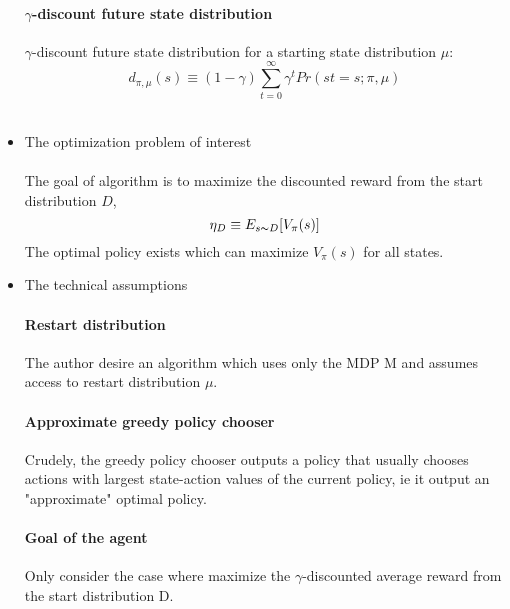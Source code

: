 \begin{itemize}
    
    \paragraph{$\gamma$-discount future state distribution \\} $\gamma$-discount future state distribution for
    a starting state distribution $\mu$:
    \[d_{\pi,\mu}(s) \equiv (1 - \gamma) \sum_{t=0}^{\infty} \gamma^{t} Pr(st=s;\pi, \mu) \] \\
    
    
    
    \item The optimization problem of interest
    \paragraph{}
    The goal of algorithm is to maximize the discounted reward from the start distribution $D$,
    \[\eta_{D} \equiv E_{s{\thicksim}D}[V_{\pi}(s)]\]
    The optimal policy exists which can maximize $V_{\pi}(s)$ for all states. \\
    
    \newpage
    \item The technical assumptions
    \paragraph{Restart distribution \\}
    The author desire an algorithm which uses only the MDP M and assumes access
    to restart distribution $\mu$.
    \paragraph{Approximate greedy policy chooser \\} 
    Crudely, the greedy policy chooser outputs a policy that usually chooses actions with largest state-action values of the current policy, ie it output
    an "approximate" optimal policy.
    
    \paragraph{Goal of the agent \\}
    Only consider the case where maximize the $\gamma$-discounted average reward
    from the start distribution D.
    
    
    
\end{itemize}
